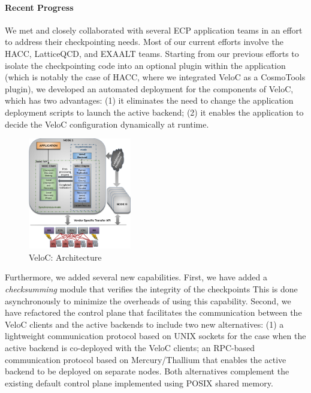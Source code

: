 \paragraph{Recent Progress}

We met and closely collaborated with several ECP application teams in
an effort to address their checkpointing needs. Most of our current
efforts involve the HACC, LatticeQCD, and EXAALT teams. Starting from
our previous efforts to isolate the checkpointing code into an optional
plugin within the application (which is notably the case of HACC, where
we integrated VeloC as a CosmoTools plugin), we developed an automated
deployment for the components of VeloC, which has two advantages: (1)
it eliminates the need to change the application deployment scripts
to launch the active backend; (2) it enables the application to decide
the VeloC configuration dynamically at runtime.

\begin{figure}
  \includegraphics[width=0.4\textwidth]{projects/2.3.4-DataViz/2.3.4.14-VeloC-SZ/veloc-arch}
  \caption{VeloC: Architecture}%
  \label{fig:veloc:arch}%
\end{figure}

Furthermore, we added several new capabilities. First, we have added
a \emph{checksumming} module that verifies the integrity of the checkpoints
This is done asynchronously to minimize the overheads of using this capability.
Second, we have refactored the control plane that facilitates the communication
between the VeloC clients and the active backends to include two new alternatives:
(1) a lightweight communication protocol based on UNIX sockets for the case
when the active backend is co-deployed with the VeloC clients; an RPC-based
communication protocol based on Mercury/Thallium that enables the active
backend to be deployed on separate nodes. Both alternatives complement the
existing default control plane implemented using POSIX shared memory.

